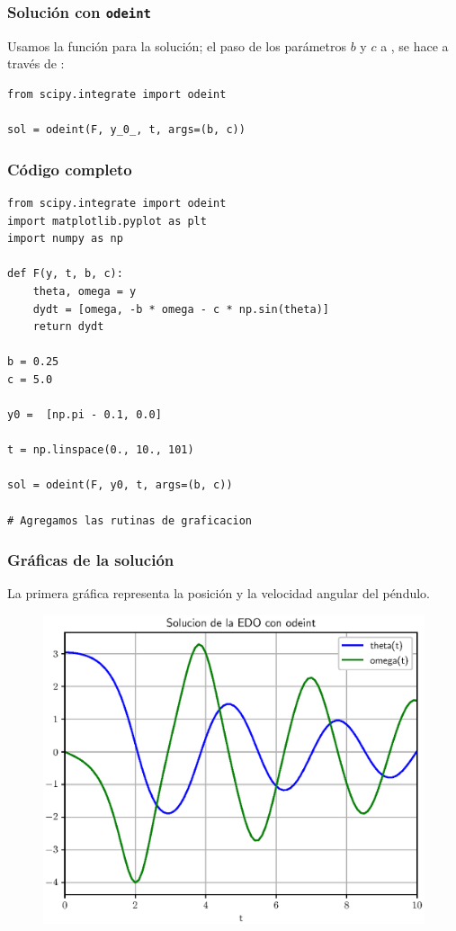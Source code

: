 \documentclass[12pt]{beamer}
\begin{document}
\begin{frame}[fragile]
\frametitle{Solución con \texttt{odeint}}
Usamos la función  para la solución; el paso de los parámetros $b$ y $c$ a , se hace a través de :
\pause
\begin{lstlisting}[caption=Solución con odeint]
from scipy.integrate import odeint

sol = odeint(F, y_0_, t, args=(b, c))
\end{lstlisting}
\end{frame}
\begin{frame}
\frametitle{Código completo}
\begin{lstlisting}[caption=Función con las EDO1 a integrar]
from scipy.integrate import odeint
import matplotlib.pyplot as plt
import numpy as np

def F(y, t, b, c):
    theta, omega = y
    dydt = [omega, -b * omega - c * np.sin(theta)]
    return dydt

b = 0.25
c = 5.0

y0 =  [np.pi - 0.1, 0.0]

t = np.linspace(0., 10., 101)

sol = odeint(F, y0, t, args=(b, c))

# Agregamos las rutinas de graficacion
\end{lstlisting}
\end{frame}
\begin{frame}[plain]
\frametitle{Gráficas de la solución}
La primera gráfica representa la posición y la velocidad angular del péndulo.
\begin{figure}
    \centering
    \includegraphics[scale=0.5]{Imagenes/plot_Ejercicio_odeint_01_Pendulo.eps}
\end{figure}
\end{frame}
\end{document}

